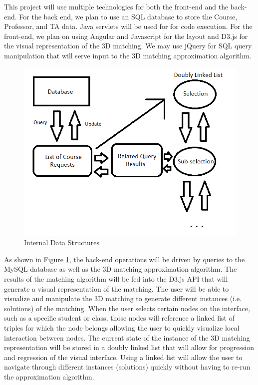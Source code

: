 \textnormal{This project will use multiple technologies for both the front-end and the back-end. For the back end, we plan to use an SQL database to store the Course, Professor, and TA data. Java servlets will be used for for code execution. For the front-end, we plan on using Angular and Javascript for the layout and D3.js for the visual representation of the 3D matching. We may use jQuery for SQL query manipulation that will serve input to the 3D matching approximation algorithm.}

\begin{figure}
	\includegraphics[width=\linewidth]{Data_Structures.png}
	\caption{Internal Data Structures}
	\label{fig:fig1}
\end{figure}

As shown in Figure \ref{fig:fig1}, the back-end operations will be driven by queries to the MySQL database as well as the 3D matching approximation algorithm. The results of the matching algorithm will be fed into the D3.js API that will generate a visual representation of the matching. The user will be able to visualize and manipulate the 3D matching to generate different instances (i.e. solutions) of the matching. When the user selects certain nodes on the interface, such as a specific student or class, those nodes will reference a linked list of triples for which the node belongs allowing the user to quickly visualize local interaction between nodes. The current state of the instance of the 3D matching representation will be stored in a doubly linked list that will allow for progression and regression of the visual interface.  Using a linked list will allow the user to navigate through different instances (solutions) quickly without having to re-run the approximation algorithm.
\\\\